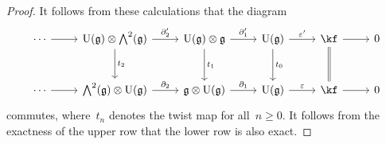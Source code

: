 \begin{proof}
	It follows from these calculations that the diagram
	\[
		\begin{tikzcd}[row sep = large]
			\dotsb
			\arrow{r}
			&
			\Univ(\glie) \otimes \Exterior^2(\glie)
			\arrow{r}[above]{\del'_2}
			\arrow{d}[right]{t_2}
			&
			\Univ(\glie) \otimes \glie
			\arrow{r}[above]{\del'_1}
			\arrow{d}[right]{t_1}
			&
			\Univ(\glie)
			\arrow{r}[above]{\varepsilon'}
			\arrow{d}[right]{t_0}
			&
			\kf
			\arrow{r}
			\arrow[equal]{d}
			&
			0
			\\
			\dotsb
			\arrow{r}
			&
			\Exterior^2(\glie) \otimes \Univ(\glie)
			\arrow{r}[above]{\del_2}
			&
			\glie \otimes \Univ(\glie)
			\arrow{r}[above]{\del_1}
			&
			\Univ(\glie)
			\arrow{r}[above]{\varepsilon}
			&
			\kf
			\arrow{r}
			&
			0
		\end{tikzcd}
	\]
	commutes, where~$t_n$ denotes the twist map for all~$n \geq 0$.
	It follows from the exactness of the upper row that the lower row is also exact.
\end{proof}





